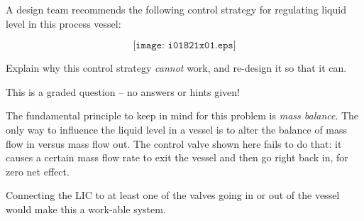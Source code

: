 

A design team recommends the following control strategy for regulating liquid level in this process vessel:

$$\texttt{[image: i01821x01.eps]}$$

Explain why this control strategy {\it cannot} work, and re-design it so that it can.

\vfil

\eject






This is a graded question -- no answers or hints given!







The fundamental principle to keep in mind for this problem is {\it mass balance}.  The only way to influence the liquid level in a vessel is to alter the balance of mass flow in versus mass flow out.  The control valve shown here fails to do that: it causes a certain mass flow rate to exit the vessel and then go right back in, for zero net effect.

Connecting the LIC to at least one of the valves going in or out of the vessel would make this a work-able system.




